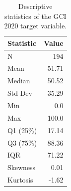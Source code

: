 \begin{table}
    \caption{Descriptive statistics of the GCI 2020 target variable.}
    \label{tab:gci_stats}
    \centering
    \small
    \begin{tabular}{lr}
        \toprule
        Statistic & Value \\
        \midrule
        N & 194 \\
        Mean & 51.71 \\
        Median & 50.52 \\
        Std Dev & 35.29 \\
        Min & 0.0 \\
        Max & 100.0 \\
        Q1 (25\%) & 17.14 \\
        Q3 (75\%) & 88.36 \\
        IQR & 71.22 \\
        Skewness & 0.01 \\
        Kurtosis & -1.62 \\
        \bottomrule
    \end{tabular}
\end{table}
